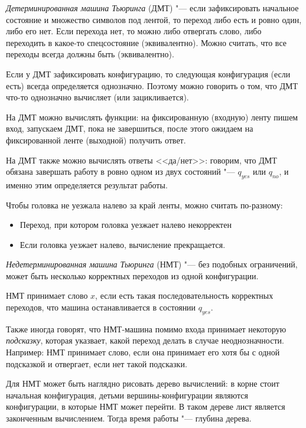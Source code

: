 	\begin{Def}
		\textit{Детерминированная машина Тьюринга} (ДМТ) "--- если зафиксировать начальное состояние и множество символов под лентой, то переход либо есть и ровно один, либо его нет.
		Если перехода нет, то можно либо отвергать слово, либо переходить в какое-то спецсостояние (эквивалентно).
		Можно считать, что все переходы всегда должны быть (эквивалентно).
	\end{Def}
	\begin{Rem}
		Если у ДМТ зафиксировать конфигурацию, то следующая конфигурация (если есть) всегда определяется однозначно.
		Поэтому можно говорить о том, что ДМТ что-то однозначно вычисляет (или зацикливается).
	\end{Rem}
	\begin{Def}
		На ДМТ можно вычислять функции: на фиксированную (входную) ленту пишем вход, запускаем ДМТ, пока не завершиться, после этого ожидаем на фиксированной ленте (выходной) получить ответ.
	\end{Def}
	\begin{Def}
		На ДМТ также можно вычислять ответы <<да/нет>>: говорим, что ДМТ обязана завершать работу в ровно одном из двух состояний "--- $q_{yes}$ или $q_{no}$, и именно этим определяется результат работы.
	\end{Def}
	\begin{Rem}
		Чтобы головка не уезжала налево за край ленты, можно считать по-разному:
		\begin{itemize}
			\item Переход, при котором головка уезжает налево некорректен
			\item Если головка уезжает налево, вычисление прекращается.
		\end{itemize}
	\end{Rem}

	\begin{Def}
		\textit{Недетерминированная машина Тьюринга} (НМТ) "--- без подобных ограничений, может быть несколько корректных переходов из одной конфигурации.
	\end{Def}
	\begin{Def}
		НМТ принимает слово $x$, если есть такая последовательность корректных переходов, что машина останавливается в состоянии $q_{yes}$.
	\end{Def}
	\begin{Rem}
		Также иногда говорят, что НМТ-машина помимо входа принимает некоторую \textit{подсказку}, которая указвает, какой переход делать в случае неоднозначности.
		Например: НМТ принимает слово, если она принимает его хотя бы с одной подсказкой и отвергает, если нет такой подсказки.
	\end{Rem}
	\begin{Rem}
		Для НМТ может быть наглядно рисовать дерево вычислений: в корне стоит начальная конфигурация, детьми вершины-конфигурации являются конфигурации,
		в которые НМТ может перейти.
		В таком дереве лист является законченным вычислением.
		Тогда время работы "--- глубина дерева.
	\end{Rem}

